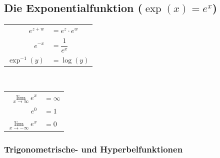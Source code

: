 \documentclass[a4paper, fontsize = 8pt, landscape]{scrartcl}
\begin{document}
\begin{multicols*}{3}
    \subsection{Die Exponentialfunktion ($\exp(x) = e^x$)}

    \begin{center}
        \renewcommand{\arraystretch}{1.35}
        \begin{minipage}{0.47 \linewidth}
            \begin{center}
                \begin{tabular}{r l}
                    $e^{z + w}$    & \hspace*{-10pt}$= e^z \cdot e^w$  \\
                    $e^{-x}$       & \hspace*{-10pt}$= \dfrac{1}{e^x}$ \\
                    $\exp^{-1}(y)$ & \hspace*{-10pt}$= \log(y)$        \\
                \end{tabular}
            \end{center}
        \end{minipage}
        \,\vline\,
        \begin{minipage}{0.47 \linewidth}
            \begin{center}
                \renewcommand{\arraystretch}{1.35}
                \begin{tabular}{r l}
                    $\lim\limits_{x \to \infty} e^x$  & \hspace*{-10pt}$= \infty$ \\
                    $e^0$                             & \hspace*{-10pt}$= 1$      \\
                    $\lim\limits_{x \to -\infty} e^x$ & \hspace*{-10pt}$= 0$      \\
                \end{tabular}
            \end{center}
        \end{minipage}
    \end{center}

    \subsubsection{Trigonometrische- und Hyperbelfunktionen}


\end{multicols*}
\end{document}
